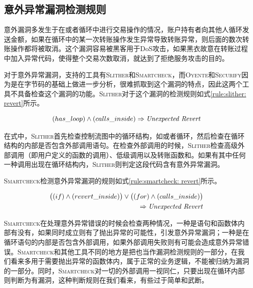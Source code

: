 \subsection{意外异常漏洞检测规则}

意外漏洞多发生于在或者循环中进行交易操作的情况，账户持有者向其他人循环发送金额，如果在循环中的某一次转账操作发生异常导致转账异常，则后面的数次转账操作都将被取消。这个漏洞容易被黑客用于DoS攻击，如果黑衣故意在转账过程中加入异常代码，使得整个交易次数取消，就达到了拒绝服务攻击的目的。

对于意外异常漏洞，支持的工具有\textsc{Slither}和\textsc{Smartcheck}，而\textsc{Oyente}和\textsc{Securify}因为是在字节码的基础上做进一步分析，很难抓取到这个漏洞的特点，因此这两个工具不具备检查这个漏洞的功能。\textsc{Slither}对于这个漏洞的检测规则如式\ref{rule:slither: revert}所示。
\begin{mdframed}[
	linewidth = 1pt,
	innertopmargin = -5pt,
	innerbottommargin = 3pt,
	outerlinewidth = 1pt
	]
    \small
	\begin{equation} \label{rule:slither: revert}
    (has\_loop) \wedge (calls\_inside) \Rightarrow \text{\emph{Unexpected Revert}}
	\end{equation}
\end{mdframed}

在式中，\textsc{Slither}首先检查控制流图中的循环结构，如或者循环，然后检查在循环结构的内部是否包含外部调用语句。在检查外部调用的时候，\textsc{Slither}检查高级外部调用（即用户定义的函数的调用）、低级调用以及转账函数和。如果有其中任何一种调用出现在循环结构内，\textsc{Slither}则判定这段代码含有意外异常漏洞。

\textsc{Smartcheck}检测意外异常漏洞的规则如式\ref{rule:smartcheck: revert}所示。
\begin{mdframed}[
	linewidth = 1pt,
	innertopmargin = -5pt,
	innerbottommargin = 3pt,
	outerlinewidth = 1pt
	]
    \small
	\begin{equation} \label{rule:smartcheck: revert}
    \begin{split}
       \big ((if) \wedge (revert\_inside)\big ) \vee \big ((for) \wedge (calls\_inside)\big ) \\
       \Rightarrow \text{\emph{Unexpected Revert}}
    \end{split}
	\end{equation}
\end{mdframed}
\textsc{Smartcheck}在处理意外异常错误的时候会检查两种情况，一种是语句和函数体内部有没有，如果同时成立则有了抛出异常的可能性，引发意外异常漏洞；一种是在循环语句的内部是否包含外部调用，如果外部调用失败则有可能会造成意外异常错误。\textsc{Smartcheck}和其他工具不同的地方是把也当作漏洞检测规则的一部分，在我们看来多用于需要抛出异常的函数体内，属于正常的业务逻辑，不能被归纳为漏洞的一部分。同时，\textsc{Smartcheck}对一切的外部调用一视同仁，只要出现在循环内部则判断为有漏洞，这种判断规则在我们看来，有些过于简单和武断。


